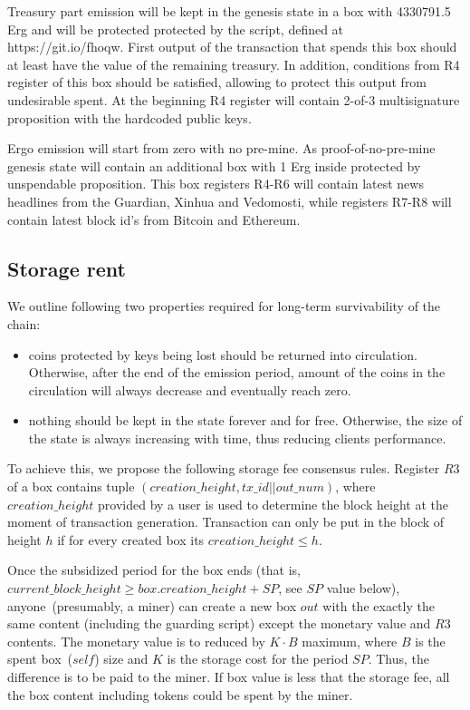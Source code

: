 Treasury part emission will be kept in the genesis state in a box with 4330791.5 Erg and
will be protected protected by the script, defined at https://git.io/fhoqw.
First output of the transaction that spends this box should at least have the value of the
remaining treasury.
In addition, conditions from R4 register of this box should be satisfied,
allowing to protect this output from undesirable spent.
At the beginning R4 register will contain 2-of-3
multisignature proposition with the hardcoded public keys.

Ergo emission will start from zero with no pre-mine. As proof-of-no-pre-mine genesis state
will contain an additional box with 1 Erg inside protected by unspendable proposition.
This box registers R4-R6 will contain latest news headlines from the Guardian, Xinhua and Vedomosti,
while registers R7-R8 will contain latest block id's from Bitcoin and Ethereum.

\subsection{Storage rent}

We outline following two properties required for long-term survivability of the chain:

\begin{itemize}
    \item{} coins protected by keys being lost should be returned into circulation.
    Otherwise, after the end of the emission period, amount of the coins
    in the circulation will always decrease and eventually reach zero.
    \item{} nothing should be kept in the state forever and for free.
    Otherwise, the size of the state is always increasing with time, thus reducing clients performance.
\end{itemize}

To achieve this, we propose the following storage fee consensus rules.
Register $R3$ of a box contains tuple $(creation\_height, tx\_id || out\_num)$, where $creation\_height$ provided by a user
is used to determine the block height at the moment of transaction generation.
Transaction can only be put in the block of height $h$ if for every created box its $creation\_height \le h$.

Once the subsidized period for the box ends (that is,
$current\_block\_height \ge box.creation\_height + SP$, see $SP$ value below), anyone~(presumably, a miner) can
create a new box $out$ with the exactly the same content (including the guarding
script) except the monetary value and $R3$ contents. The monetary value is to
reduced by $K \cdot B$ maximum, where $B$ is the spent box~($self$)
size and $K$ is the storage cost for the period $SP$. Thus, the difference is to be paid to the miner.
If box value is less that the storage fee, all the box content including tokens could be spent by the miner.

